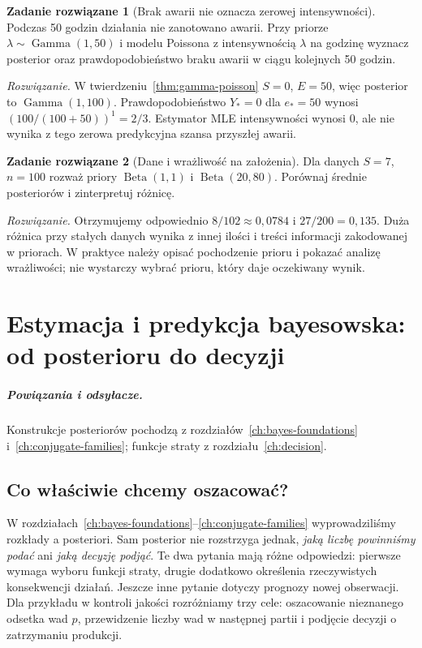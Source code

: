 \documentclass[11pt,a4paper,oneside]{report}
\numberwithin{equation}{chapter}
\theoremstyle{plain}
\theoremstyle{definition}
\newtheorem{zadanie}{Zadanie rozwiązane}[chapter]
\theoremstyle{remark}
\begin{document}
\begin{zadanie}[Brak awarii nie oznacza zerowej intensywności]
Podczas 50 godzin działania nie zanotowano awarii. Przy priorze
$\lambda\sim\operatorname{Gamma}(1,50)$ i modelu Poissona
z intensywnością $\lambda$ na godzinę wyznacz posterior oraz
prawdopodobieństwo braku awarii w ciągu kolejnych 50 godzin.
\par\emph{Rozwiązanie.} W twierdzeniu~\ref{thm:gamma-poisson}
$S=0$, $E=50$, więc posterior to $\operatorname{Gamma}(1,100)$.
Prawdopodobieństwo $Y_*=0$ dla $e_*=50$ wynosi
$(100/(100+50))^1=2/3$.
Estymator MLE intensywności wynosi $0$, ale nie wynika z tego
zerowa predykcyjna szansa przyszłej awarii.
\end{zadanie}

\begin{zadanie}[Dane i wrażliwość na założenia]
Dla danych $S=7$, $n=100$ rozważ priory
$\operatorname{Beta}(1,1)$ i $\operatorname{Beta}(20,80)$.
Porównaj średnie posteriorów i zinterpretuj różnicę.
\par\emph{Rozwiązanie.} Otrzymujemy odpowiednio
$8/102\approx0{,}0784$ i $27/200=0{,}135$.
Duża różnica przy stałych danych wynika z innej ilości i treści
informacji zakodowanej w priorach. W praktyce należy opisać
pochodzenie prioru i pokazać analizę wrażliwości; nie wystarczy
wybrać prioru, który daje oczekiwany wynik.
\end{zadanie}


\chapter{Estymacja i predykcja bayesowska: od posterioru do decyzji}
\label{ch:bayes-estimation-prediction}
\paragraph{Powiązania i odsyłacze.} Konstrukcje posteriorów pochodzą z rozdziałów~\ref{ch:bayes-foundations} i~\ref{ch:conjugate-families}; funkcje straty z rozdziału~\ref{ch:decision}.


\section{Co właściwie chcemy oszacować?}
W rozdziałach~\ref{ch:bayes-foundations}--\ref{ch:conjugate-families}
wyprowadziliśmy rozkłady a posteriori. Sam posterior nie rozstrzyga
jednak, \emph{jaką liczbę powinniśmy podać} ani \emph{jaką decyzję
podjąć}. Te dwa pytania mają różne odpowiedzi: pierwsze wymaga
wyboru funkcji straty, drugie dodatkowo określenia rzeczywistych
konsekwencji działań. Jeszcze inne pytanie dotyczy prognozy
nowej obserwacji. Dla przykładu w kontroli jakości rozróżniamy
trzy cele: oszacowanie nieznanego odsetka wad $p$, przewidzenie
liczby wad w następnej partii i podjęcie decyzji o zatrzymaniu produkcji.
\end{document}
